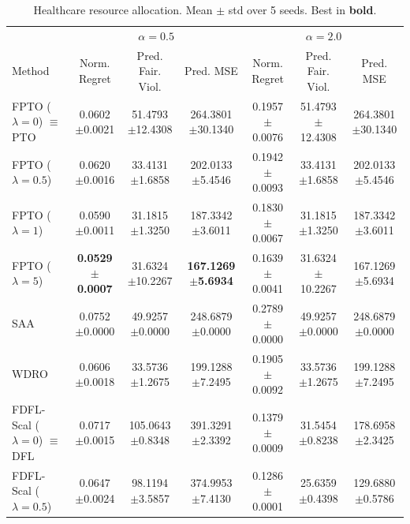 \begin{table}[htbp]
\centering
\caption{Healthcare resource allocation. Mean $\pm$ std over 5 seeds. Best in \textbf{bold}.}
\label{tab:healthcare}
\small
\begin{tabular}{lccc|ccc}
\toprule
 & \multicolumn{3}{c}{$\alpha=0.5$} & \multicolumn{3}{c}{$\alpha=2.0$} \\
Method & Norm. Regret & Pred. Fair. Viol. & Pred. MSE & Norm. Regret & Pred. Fair. Viol. & Pred. MSE \\
\midrule
FPTO ($\lambda=0$) $\equiv$ PTO & 0.0602 {\scriptsize$\pm$0.0021} & 51.4793 {\scriptsize$\pm$12.4308} & 264.3801 {\scriptsize$\pm$30.1340} & 0.1957 {\scriptsize$\pm$0.0076} & 51.4793 {\scriptsize$\pm$12.4308} & 264.3801 {\scriptsize$\pm$30.1340} \\
FPTO ($\lambda=0.5$) & 0.0620 {\scriptsize$\pm$0.0016} & 33.4131 {\scriptsize$\pm$1.6858} & 202.0133 {\scriptsize$\pm$5.4546} & 0.1942 {\scriptsize$\pm$0.0093} & 33.4131 {\scriptsize$\pm$1.6858} & 202.0133 {\scriptsize$\pm$5.4546} \\
FPTO ($\lambda=1$) & 0.0590 {\scriptsize$\pm$0.0011} & 31.1815 {\scriptsize$\pm$1.3250} & 187.3342 {\scriptsize$\pm$3.6011} & 0.1830 {\scriptsize$\pm$0.0067} & 31.1815 {\scriptsize$\pm$1.3250} & 187.3342 {\scriptsize$\pm$3.6011} \\
FPTO ($\lambda=5$) & \textbf{0.0529 {\scriptsize$\pm$0.0007}} & 31.6324 {\scriptsize$\pm$10.2267} & \textbf{167.1269 {\scriptsize$\pm$5.6934}} & 0.1639 {\scriptsize$\pm$0.0041} & 31.6324 {\scriptsize$\pm$10.2267} & 167.1269 {\scriptsize$\pm$5.6934} \\
\midrule
SAA & 0.0752 {\scriptsize$\pm$0.0000} & 49.9257 {\scriptsize$\pm$0.0000} & 248.6879 {\scriptsize$\pm$0.0000} & 0.2789 {\scriptsize$\pm$0.0000} & 49.9257 {\scriptsize$\pm$0.0000} & 248.6879 {\scriptsize$\pm$0.0000} \\
WDRO & 0.0606 {\scriptsize$\pm$0.0018} & 33.5736 {\scriptsize$\pm$1.2675} & 199.1288 {\scriptsize$\pm$7.2495} & 0.1905 {\scriptsize$\pm$0.0092} & 33.5736 {\scriptsize$\pm$1.2675} & 199.1288 {\scriptsize$\pm$7.2495} \\
\midrule
FDFL-Scal ($\lambda=0$) $\equiv$ DFL & 0.0717 {\scriptsize$\pm$0.0015} & 105.0643 {\scriptsize$\pm$0.8348} & 391.3291 {\scriptsize$\pm$2.3392} & 0.1379 {\scriptsize$\pm$0.0009} & 31.5454 {\scriptsize$\pm$0.8238} & 178.6958 {\scriptsize$\pm$2.3425} \\
FDFL-Scal ($\lambda=0.5$) & 0.0647 {\scriptsize$\pm$0.0024} & 98.1194 {\scriptsize$\pm$3.5857} & 374.9953 {\scriptsize$\pm$7.4130} & 0.1286 {\scriptsize$\pm$0.0001} & 25.6359 {\scriptsize$\pm$0.4398} & 129.6880 {\scriptsize$\pm$0.5786} \\

\end{tabular}
\end{table}
